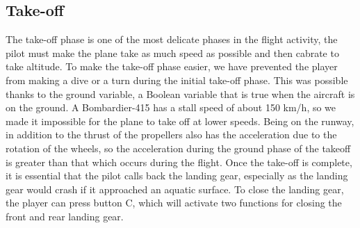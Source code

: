 \documentclass{article}
\begin{document}
\subsection*{Take-off}
The take-off phase is one of the most delicate phases in the flight activity, the pilot must make the plane take as much speed as possible and then cabrate to take altitude. To make the take-off phase easier, we have prevented the player from making a dive or a turn during the initial take-off phase. This was possible thanks to the ground variable, a Boolean variable that is true when the aircraft is on the ground. A Bombardier-415 has a stall speed of about 150 km/h, so we made it impossible for the plane to take off at lower speeds. Being on the runway, in addition to the thrust of the propellers also has the acceleration due to the rotation of the wheels, so the acceleration during the ground phase of the takeoff is greater than that which occurs during the flight. Once the take-off is complete, it is essential that the pilot calls back the landing gear, especially as the landing gear would crash if it approached an aquatic surface. To close the landing gear, the player can press button C, which will activate two functions for closing the front and rear landing gear. 
\end{document}
